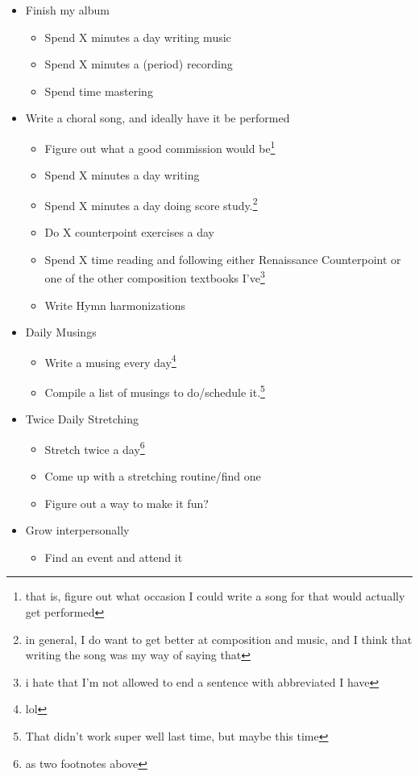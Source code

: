 \documentclass[12pt]{article}[titlepage]
\renewcommand{\,}{\textsuperscript{,}}
\begin{document}
\begin{itemize}
\begin{itemize}
\end{itemize}  
\item Finish my album  
\begin{itemize}  
\item Spend X minutes a day writing music  
\item Spend X minutes a (period) recording  
\item Spend time mastering  
\end{itemize}  
\item Write a choral song, and ideally have it be performed  
\begin{itemize}  
\item Figure out what a good commission would be\footnote{that is, figure out what occasion I could write a song for that would actually get performed}  
\item Spend X minutes a day writing  
\item Spend X minutes a day doing score study.\footnote{in general, I do want to get better at composition and music, and I think that writing the song was my way of saying that}  
\item Do X counterpoint exercises a day  
\item Spend X time reading and following either Renaissance Counterpoint or one of the other composition textbooks I've\footnote{i hate that I'm not allowed to end a sentence with abbreviated I have}  
\item Write Hymn harmonizations  
\end{itemize}  
\item Daily Musings  
\begin{itemize}  
\item Write a musing every day\footnote{lol}  
\item Compile a list of musings to do/schedule it.\footnote{That didn't work super well last time, but maybe this time}  
\end{itemize}  
\item Twice Daily Stretching  
\begin{itemize}  
\item Stretch twice a day\footnote{as two footnotes above}  
\item Come up with a stretching routine/find one  
\item Figure out a way to make it fun?  
\end{itemize}  
\item Grow interpersonally  
\begin{itemize}  
\item Find an event and attend it  

\end{itemize}
\end{itemize}
\end{document}
